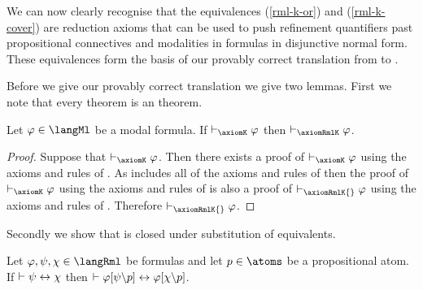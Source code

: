 We can now clearly recognise that the equivalences (\ref{rml-k-or}) and (\ref{rml-k-cover}) are reduction axioms that can be used to push refinement quantifiers past propositional connectives and modalities in formulas in disjunctive normal form.
These equivalences form the basis of our provably correct translation from \langRml{} to \langMl{}.

Before we give our provably correct translation we give two lemmas.
First we note that every \axiomK{} theorem is an \axiomRmlK{} theorem.

\begin{lemma}\label{rml-k-ml-provability}
Let $\phi \in \langMl$ be a modal formula.
If $\proves_\axiomK \phi$ then $\proves_\axiomRmlK \phi$.
\end{lemma}

\begin{proof}
Suppose that $\proves_\axiomK \phi$.
Then there exists a proof of $\proves_\axiomK \phi$ using the axioms and rules of \axiomK{}.
As \axiomRmlK{} includes all of the axioms and rules of \axiomK{} then the proof of $\proves_\axiomK \phi$ using the axioms and rules of \axiomK{} is also a proof of $\proves_\axiomRmlK{} \phi$ using the axioms and rules of \axiomRmlK{}.
Therefore $\proves_\axiomRmlK{} \phi$.
\end{proof}

Secondly we show that \axiomRmlK{} is closed under substitution of equivalents.

\begin{lemma}\label{rml-k-substitution-equivalents}
Let $\phi, \psi, \chi \in \langRml$ be formulas and let $\atomP \in \atoms$ be a propositional atom.
If $\vdash \psi \leftrightarrow \chi$ then $\vdash \varphi[\psi\backslash p] \leftrightarrow \varphi[\chi\backslash p]$.
\end{lemma}


